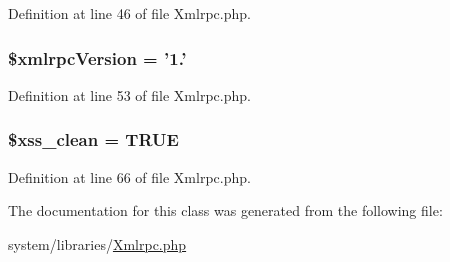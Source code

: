 Definition at line 46 of file Xmlrpc.\-php.

\hypertarget{class_c_i___xmlrpc_a4130f55bb1f23dcabf9cf3ae5f5a746d}{
\subsubsection[{\$xmlrpc\-Version}]{\setlength{\rightskip}{0pt plus 5cm}\$xmlrpc\-Version = '1.'}}\label{class_c_i___xmlrpc_a4130f55bb1f23dcabf9cf3ae5f5a746d}


Definition at line 53 of file Xmlrpc.\-php.

\hypertarget{class_c_i___xmlrpc_a0f2ee8861c0b3164a5c6e126dd98c0cc}{
\subsubsection[{\$xss\-\_\-clean}]{\setlength{\rightskip}{0pt plus 5cm}\$xss\-\_\-clean = T\-R\-U\-E}}\label{class_c_i___xmlrpc_a0f2ee8861c0b3164a5c6e126dd98c0cc}


Definition at line 66 of file Xmlrpc.\-php.



The documentation for this class was generated from the following file\-:\begin{DoxyCompactItemize}
\item 
system/libraries/\hyperlink{_xmlrpc_8php}{Xmlrpc.\-php}\end{DoxyCompactItemize}
